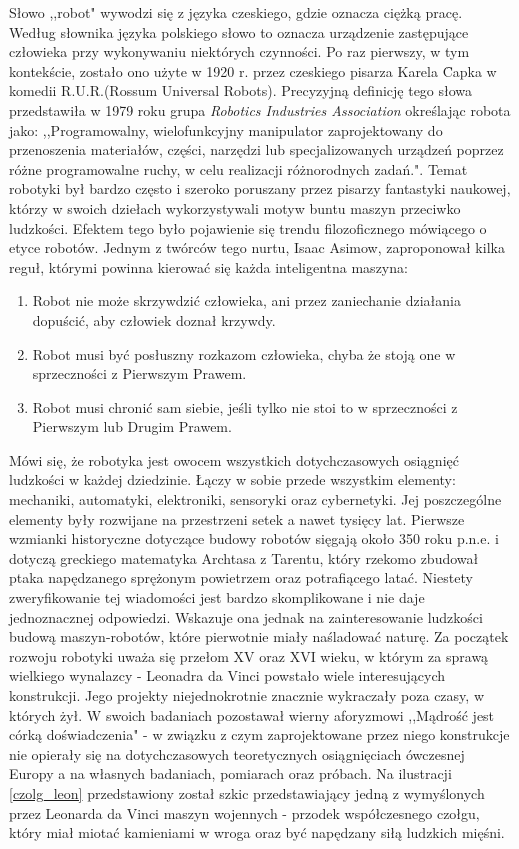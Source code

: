 Słowo ,,robot" wywodzi się z języka czeskiego, gdzie oznacza ciężką pracę. 
Według słownika języka polskiego słowo to oznacza urządzenie zastępujące człowieka przy wykonywaniu niektórych czynności. Po raz pierwszy, w tym kontekście, zostało ono użyte w 1920 r. przez czeskiego pisarza Karela \newtie{C}apka w komedii R.U.R.(Rossum Universal Robots)\cite{Czech}. Precyzyjną definicję tego słowa przedstawiła w 1979 roku grupa \textit{Robotics Industries Association} określając robota jako: ,,Programowalny, wielofunkcyjny manipulator zaprojektowany do przenoszenia materiałów, części, narzędzi lub specjalizowanych urządzeń poprzez różne programowalne ruchy, w celu realizacji różnorodnych zadań."\cite{def_robota}.
Temat robotyki był bardzo często i szeroko poruszany przez pisarzy fantastyki naukowej, którzy w swoich dziełach wykorzystywali motyw buntu maszyn przeciwko ludzkości. Efektem tego było pojawienie się trendu filozoficznego mówiącego o etyce robotów. Jednym z twórców tego nurtu, Isaac Asimow, zaproponował kilka reguł, którymi powinna kierować się każda inteligentna maszyna\cite{prawa_robota}:
\begin{enumerate}
\item Robot nie może skrzywdzić człowieka, ani przez zaniechanie działania dopuścić, aby człowiek doznał krzywdy.
\item Robot musi być posłuszny rozkazom człowieka, chyba że stoją one w sprzeczności z Pierwszym Prawem.
\item Robot musi chronić sam siebie, jeśli tylko nie stoi to w sprzeczności z Pierwszym lub Drugim Prawem.
\end{enumerate}
Mówi się, że robotyka jest owocem wszystkich dotychczasowych osiągnięć ludzkości w każdej dziedzinie. Łączy w sobie przede wszystkim elementy: mechaniki, automatyki, elektroniki, sensoryki oraz cybernetyki.
Jej poszczególne elementy były rozwijane na przestrzeni setek a nawet tysięcy lat. Pierwsze wzmianki historyczne dotyczące budowy robotów sięgają około 350 roku p.n.e. i dotyczą greckiego matematyka Archtasa z Tarentu, który rzekomo zbudował ptaka napędzanego sprężonym powietrzem oraz potrafiącego latać. Niestety  zweryfikowanie tej wiadomości jest bardzo skomplikowane i nie daje jednoznacznej odpowiedzi. Wskazuje ona jednak na zainteresowanie ludzkości budową maszyn-robotów, które pierwotnie miały naśladować naturę. Za początek rozwoju robotyki uważa się przełom XV oraz XVI wieku, w którym za sprawą wielkiego wynalazcy - Leonadra da Vinci powstało wiele interesujących konstrukcji. Jego projekty niejednokrotnie znacznie wykraczały poza czasy, w których żył. W swoich badaniach pozostawał wierny aforyzmowi ,,Mądrość jest
córką doświadczenia" - w związku z czym zaprojektowane przez niego konstrukcje nie opierały się na dotychczasowych teoretycznych osiągnięciach ówczesnej Europy a na własnych badaniach, pomiarach oraz próbach\cite{da_vinci}.  Na ilustracji \ref{czolg_leon} przedstawiony został szkic przedstawiający jedną z wymyślonych przez Leonarda da Vinci maszyn wojennych - przodek współczesnego czołgu, który miał miotać kamieniami w wroga oraz być napędzany siłą ludzkich mięśni.\newpage

